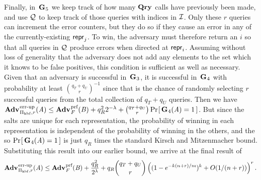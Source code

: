 Finally, in~$\mathbf{G}\hspace{0.5pt}_5$ we keep track of how many $\mathbf{Qry}\hspace{0.5pt}$ calls have previously been made, and use $\mathcal{Q}$ to keep track of those queries with indices in $\mathcal{I}$. Only these $r$ queries can increment the error counters, but they do so if they cause an error in any of the currently-existing $\mathsf{repr}_j$. To win, the adversary must therefore return an $i$ so that all queries in $\mathcal{Q}$ produce errors when directed at $\mathsf{repr}_i$. Assuming without loss of generality that the adversary does not add any elements to the set which it knows to be false positives, this condition is sufficient as well as necessary. Given that an adversary is successful in~$\mathbf{G}\hspace{0.5pt}_3$, it is successful in~$\mathbf{G}\hspace{0.5pt}_4$ with probability at least $\binom{q_T+q_U}{r}^{-1}$ since that is the chance of randomly selecting $r$ successful queries from the total collection of $q_T+q_U$ queries. Then we have $\Adv{\errep}_{\struct_\prfbloom,r}(\advA) \le \Adv{\prf}_F(\advB) + q_R^22^{-\lambda} + \binom{q_T+q_U}{r}\Prob{\G_4(\advA)=1}$. But since the salts are unique for each representation, the probability of winning in each representation is independent of the probability of winning in the others, and the so $\Pr\hspace{-1pt}\left[\,\mathbf{G}\hspace{0.5pt}_4(\mathit{A})=1\,\right]$ is just $q_R$ times the standard Kirsch and Mitzenmacher bound. Substituting this result into our earlier bound, we arrive at the final result of
$$\Adv{\errep}_{\struct_\prfbloom,r}(\advA) \le \Adv{\prf}_F(\advB) + \frac{q_R^2}{2^\lambda} + q_R\binom{q_T+q_U}{r}\left((1-e^{-k(n+r)/m})^k+O(1/(n+r))\right)^r.$$

